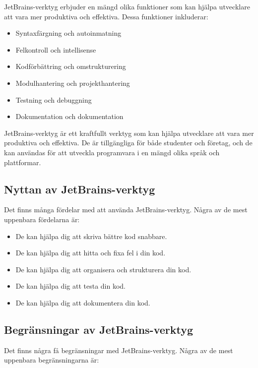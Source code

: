 JetBrains-verktyg erbjuder en mängd olika funktioner som kan hjälpa
utvecklare att vara mer produktiva och effektiva. Dessa funktioner
inkluderar:

\begin{itemize}
\tightlist
\item
  Syntaxfärgning och autoinmatning
\item
  Felkontroll och intellisense
\item
  Kodförbättring och omstrukturering
\item
  Modulhantering och projekthantering
\item
  Testning och debuggning
\item
  Dokumentation och dokumentation
\end{itemize}

JetBrains-verktyg är ett kraftfullt verktyg som kan hjälpa utvecklare
att vara mer produktiva och effektiva. De är tillgängliga för både
studenter och företag, och de kan användas för att utveckla programvara
i en mängd olika språk och plattformar.

\hypertarget{nyttan-av-jetbrains-verktyg}{%
\subsection{Nyttan av
JetBrains-verktyg}\label{nyttan-av-jetbrains-verktyg}}

Det finns många fördelar med att använda JetBrains-verktyg. Några av de
mest uppenbara fördelarna är:

\begin{itemize}
\tightlist
\item
  De kan hjälpa dig att skriva bättre kod snabbare.
\item
  De kan hjälpa dig att hitta och fixa fel i din kod.
\item
  De kan hjälpa dig att organisera och strukturera din kod.
\item
  De kan hjälpa dig att testa din kod.
\item
  De kan hjälpa dig att dokumentera din kod.
\end{itemize}

\hypertarget{begruxe4nsningar-av-jetbrains-verktyg}{%
\subsection{Begränsningar av
JetBrains-verktyg}\label{begruxe4nsningar-av-jetbrains-verktyg}}

Det finns några få begränsningar med JetBrains-verktyg. Några av de mest
uppenbara begränsningarna är:

